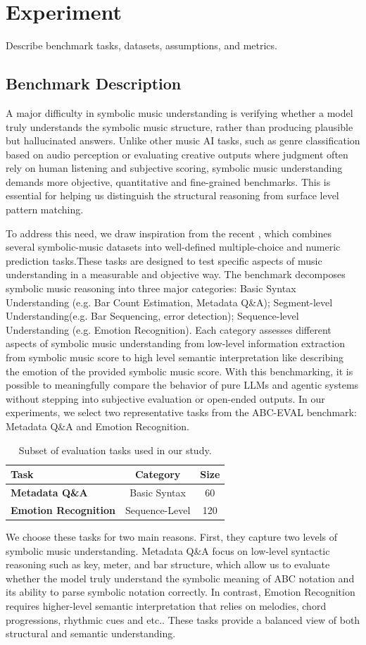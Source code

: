 \documentclass[sigconf]{acmart}
\begin{document}
\section{Experiment}
Describe benchmark tasks, datasets, assumptions, and metrics.
\subsection{Benchmark Description}
A major difficulty in symbolic music understanding is verifying whether a model truly understands the symbolic music structure, rather than producing plausible but hallucinated answers. Unlike other music AI tasks, such as genre classification based on audio perception or evaluating creative outputs where judgment often rely on human listening and subjective scoring, symbolic music understanding demands more objective, quantitative and fine-grained benchmarks. This is essential for helping us distinguish the structural reasoning from surface level pattern matching. 

To address this need, we draw inspiration from the recent \citet{zhaoABCEvalBenchmarkingLarge2025}, which combines several symbolic-music datasets into well-defined multiple-choice and numeric prediction tasks.These tasks are designed to test specific aspects of music understanding in a measurable and objective way. The benchmark decomposes symbolic music reasoning into three major categories: Basic Syntax Understanding (e.g. Bar Count Estimation, Metadata  Q\&A); Segment-level Understanding(e.g. Bar Sequencing, error detection); Sequence-level Understanding (e.g. Emotion Recognition). Each category assesses different aspects of symbolic music understanding from low-level information extraction from symbolic music score to high level semantic interpretation like describing the emotion of the provided symbolic music score.  With this benchmarking, it is possible to meaningfully compare the behavior of pure LLMs and agentic systems without stepping into subjective evaluation or open-ended outputs.  In our experiments, we select two representative tasks from the ABC-EVAL benchmark: Metadata Q\&A and Emotion Recognition. 
\begin{table}[h]
\centering
\begin{tabular}{lcc}
\toprule
\textbf{Task} & \textbf{Category} & \textbf{Size} \\
\midrule
\textbf{Metadata Q\&A} & Basic Syntax & 60 \\
\textbf{Emotion Recognition} & Sequence-Level & 120 \\
\bottomrule
\end{tabular}
\caption{Subset of evaluation tasks used in our study.}
\label{tab:tasks}
\end{table}
We choose these tasks for two main reasons. First, they capture two levels of symbolic music understanding. Metadata Q\&A focus on low-level syntactic reasoning such as key, meter, and bar structure, which allow us to evaluate whether the model truly understand the symbolic meaning of ABC notation and its ability to parse symbolic notation correctly. In contrast, Emotion Recognition requires higher-level semantic interpretation that relies on melodies, chord progressions, rhythmic cues and etc.. These tasks provide a balanced view of both structural and semantic understanding. 
\end{document}
